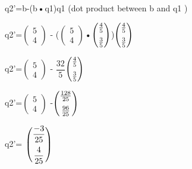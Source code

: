 \documentclass[a4paper,12pt]{article}
\begin{document}
q2'=b-(b\textbf{•}q1)q1   \hspace{4cm} (dot product between b and q1 )\\

\vspace{1cm}

q2'=$\begin{pmatrix} 5 \\ 4 \end{pmatrix}$ -  {\huge (}$\begin{pmatrix} 5 \\ 4 \end{pmatrix}$\textbf{•}$\begin{pmatrix} \frac{4}{5} \vspace*{2mm} \\ \frac{3}{5} \end{pmatrix}${\huge  )}$\begin{pmatrix} \frac{4}{5} \vspace*{2mm} \\ \frac{3}{5} \end{pmatrix}$\\

\vspace{1cm}

q2'=$\begin{pmatrix} 5 \\ 4 \end{pmatrix}$ - $\dfrac{32}{5}$$\begin{pmatrix} \frac{4}{5}\vspace*{2mm} \\ \frac{3}{5} \end{pmatrix}$\\
\vspace{0.5cm}

q2'=$\begin{pmatrix} 5 \\ 4 \end{pmatrix}$ -$\begin{pmatrix} \frac{{\tiny 128}}{{{\tiny 25}}} \vspace*{2mm} \\ \frac{{\tiny 96}}{{{\tiny 25}}} \end{pmatrix}$\\
\vspace{0.5cm}

q2'= $\begin{pmatrix} \dfrac{-3}{25} \vspace*{2mm} \\ \dfrac{4}{25} \end{pmatrix}$ \\
\vspace{0.5cm}
\end{document}
